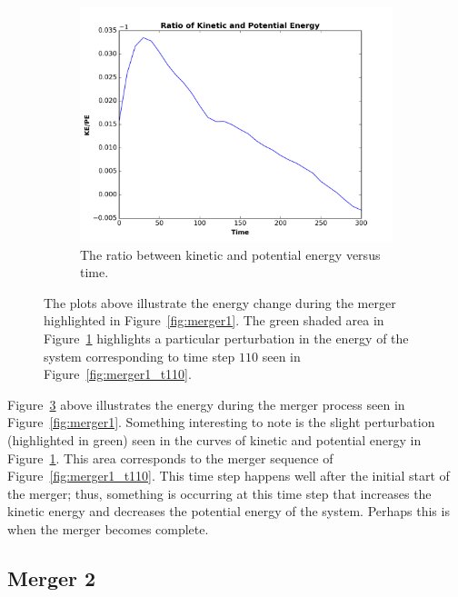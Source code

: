 \documentclass[12pt]{report}
\begin{document}
\begin{figure}[H]
\begin{subfigure}[b]{.475\textwidth}
        \label{fig:totalenergy}
    \end{subfigure} %
    \hfill
    \begin{subfigure}[b]{.475\textwidth}
        \centering
        \includegraphics[width=\linewidth]{ratioofkineticandpotential_mod1.png}
        \caption[]%
        {{The ratio between kinetic and potential energy versus time.}}
        \label{fig:ratiomerger1}
    \end{subfigure} %
    \caption[]
        {The plots above illustrate the energy change during the merger highlighted in Figure~\ref{fig:merger1}. The green shaded area in Figure~\ref{fig:totalenergy} highlights a particular perturbation in the energy of the system corresponding to time step $110$ seen in Figure~\ref{fig:merger1_t110}.} 
        \label{fig:energyofmerger1}
\end{figure}

Figure~\ref{fig:energyofmerger1} above illustrates the energy during the merger process seen in Figure~\ref{fig:merger1}. Something interesting to note is the slight perturbation (highlighted in green) seen in the curves of kinetic and potential energy in Figure~\ref{fig:totalenergy}. This area corresponds to the merger sequence of Figure~\ref{fig:merger1_t110}. This time step happens well after the initial start of the merger; thus, something is occurring at this time step that increases the kinetic energy and decreases the potential energy of the system. Perhaps this is when the merger becomes complete.

\subsection*{Merger 2}
\end{document}
